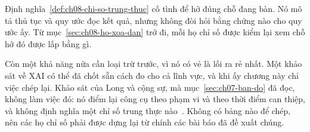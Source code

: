Định nghĩa~\ref{def:ch08-chi-so-trung-thuc} cố tình để hở đúng chỗ đang bàn.
Nó mô tả thủ tục và quy ước đọc kết quả, nhưng không đòi hỏi bằng chứng nào cho
quy ước ấy. Từ mục~\ref{sec:ch08-ho-xoa-dan} trở đi, mỗi họ chỉ số được kiểm lại
xem chỗ hở đó được lấp bằng gì.

Còn một khả năng nữa cần loại trừ trước, vì nó có vẻ là lối ra rẻ nhất. Một
khảo sát về XAI có thể đã chốt sẵn cách đo cho cả lĩnh vực, và khi ấy chương này
chỉ việc chép lại. Khảo sát của Long và cộng sự, mà
mục~\ref{sec:ch07-ban-do} đã đọc, không làm việc đó: nó điểm lại công cụ theo
phạm vi và theo thời điểm can thiệp, và không định nghĩa một chỉ số trung thực
nào~\autocite{p20trends}. Không có bảng nào để chép, nên các họ chỉ số phải được
dựng lại từ chính các bài báo đã đề xuất chúng.
